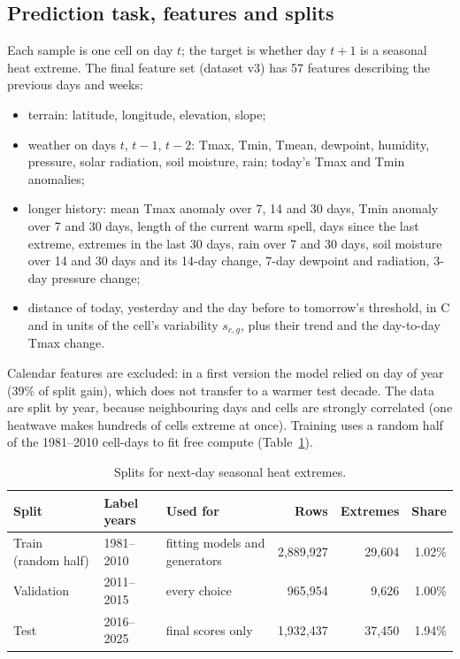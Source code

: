 \documentclass[11pt,a4paper]{article}
\begin{document}
\subsection{Prediction task, features and splits}
Each sample is one cell on day $t$; the target is whether day $t+1$ is a seasonal heat extreme. The final
feature set (dataset v3) has 57 features describing the previous days and weeks:
\begin{itemize}
  \item terrain: latitude, longitude, elevation, slope;
  \item weather on days $t$, $t-1$, $t-2$: Tmax, Tmin, Tmean, dewpoint, humidity, pressure, solar radiation,
        soil moisture, rain; today's Tmax and Tmin anomalies;
  \item longer history: mean Tmax anomaly over 7, 14 and 30 days, Tmin anomaly over 7 and 30 days, length
        of the current warm spell, days since the last extreme, extremes in the last 30 days, rain over 7 and
        30 days, soil moisture over 14 and 30 days and its 14-day change, 7-day dewpoint and radiation, 3-day
        pressure change;
  \item distance of today, yesterday and the day before to tomorrow's threshold, in \textdegree C and in units
        of the cell's variability $s_{c,g}$, plus their trend and the day-to-day Tmax change.
\end{itemize}
Calendar features are excluded: in a first version the model relied on day of year (39\% of split gain),
which does not transfer to a warmer test decade. The data are split by year, because neighbouring days and
cells are strongly correlated (one heatwave makes hundreds of cells extreme at once). Training uses a random
half of the 1981--2010 cell-days to fit free compute (Table~\ref{tab:splits}).

\begin{table}[H]
\centering\small
\caption{Splits for next-day seasonal heat extremes.}\label{tab:splits}
\begin{tabular}{@{}lllrrr@{}}
\toprule
Split & Label years & Used for & Rows & Extremes & Share\\
\midrule
Train (random half) & 1981--2010 & fitting models and generators & 2{,}889{,}927 & 29{,}604 & 1.02\%\\
Validation & 2011--2015 & every choice & 965{,}954 & 9{,}626 & 1.00\%\\
Test & 2016--2025 & final scores only & 1{,}932{,}437 & 37{,}450 & 1.94\%\\
\bottomrule
\end{tabular}
\end{table}
\end{document}
